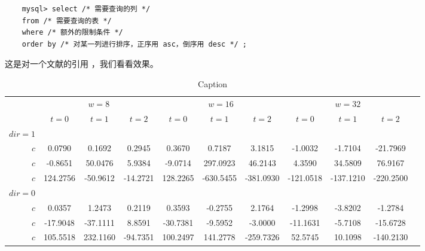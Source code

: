 \documentclass[12pt]{ctexart}
\begin{document}
\lstset{style=mystyle}
\begin{lstlisting}
    mysql> select /* 需要查询的列 */
    from /* 需要查询的表 */
    where /* 额外的限制条件 */
    order by /* 对某一列进行排序，正序用 asc，倒序用 desc */ ;
\end{lstlisting}

这是对一个文献的引用 \cite{von2019model}，我们看看效果。

\newpage 
{}
\begin{table*}
    \centering
    \footnotesize
    \begin{tabular}{@{}r*{10}{S[color=orange,table-format=-3.4]}@{}}
    \toprule
    &  &  & \\
    \cmidrule(lr){2-4} \cmidrule(lr){5-7} \cmidrule(l){8-10}
    & {$t=0$} & {$t=1$} & {$t=2$} & {$t=0$} & {$t=1$} & {$t=2$} & {$t=0$} & {$t=1$} & {$t=2$} \\
    \midrule[0.75em]  
    $dir=1$\\  
    $c$ & 0.0790 & 0.1692 & 0.2945 & 0.3670 & 0.7187 & 3.1815 & -1.0032 & -1.7104 & -21.7969\\  
    $c$ & -0.8651& 50.0476& 5.9384& -9.0714& 297.0923& 46.2143& 4.3590& 34.5809& 76.9167\\  
    $c$ & 124.2756& -50.9612& -14.2721& 128.2265& -630.5455& -381.0930& -121.0518& -137.1210& -220.2500\\  
    \addlinespace
    $dir=0$\\  
    $c$ & 0.0357& 1.2473& 0.2119& 0.3593& -0.2755& 2.1764& -1.2998& -3.8202& -1.2784\\  
    $c$ & -17.9048& -37.1111& 8.8591& -30.7381& -9.5952& -3.0000& -11.1631& -5.7108& -15.6728\\  
    $c$ & 105.5518& 232.1160& -94.7351& 100.2497& 141.2778& -259.7326& 52.5745& 10.1098& -140.2130\\  
    \bottomrule  
    \end{tabular}  
    \caption{Caption}  
\end{table*}  
\end{document}
